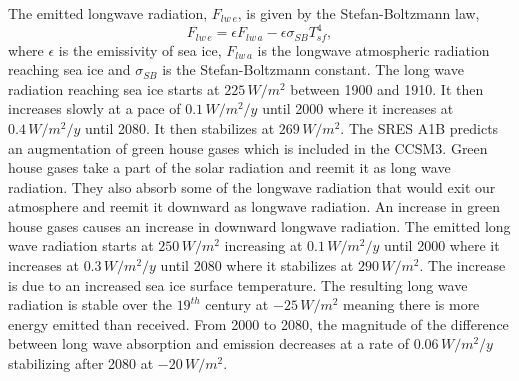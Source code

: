 The emitted longwave radiation, $F_{lw\,e}$, is given by the Stefan-Boltzmann law,
\begin{equation}
F_{lw\,e} = \epsilon F_{lw\,a} - \epsilon\sigma_{SB}T_{sf}^4,
\end{equation}
where $\epsilon$ is the emissivity of sea ice, $F_{lw\,a}$ is the longwave atmospheric radiation reaching sea ice and $\sigma_{SB}$ is the Stefan-Boltzmann constant. The long wave radiation reaching sea ice starts at $225\,W/m^2$ between 1900 and 1910. It then increases slowly at a pace of $0.1\,W/m^2/y$ until 2000 where it increases at $0.4\,W/m^2/y$ until 2080. It then stabilizes at $269\,W/m^2$. The SRES A1B predicts an augmentation of green house gases which is included in the CCSM3. Green house gases take a part of the solar radiation and reemit it as long wave radiation. They also absorb some of the longwave radiation that would exit our atmosphere and reemit it downward as longwave radiation. An increase in green house gases causes an increase in downward longwave radiation. The emitted long wave radiation starts at $250\,W/m^2$ increasing at $0.1\,W/m^2/y$ until 2000 where it increases at $0.3\,W/m^2/y$ until 2080 where it stabilizes at $290\,W/m^2$. The increase is due to an increased sea ice surface temperature. The resulting long wave radiation is stable over the $19^{th}$ century at $-25\,W/m^2$ meaning there is more energy emitted than received. From 2000 to 2080, the magnitude of the difference between long wave absorption and emission decreases at a rate of $0.06\,W/m^2/y$ stabilizing after 2080 at $-20\,W/m^2$. 

